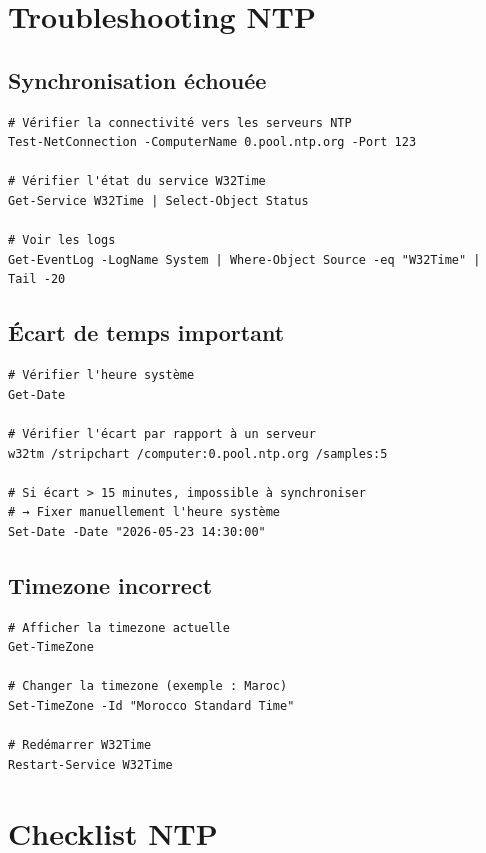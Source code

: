\section{Troubleshooting NTP}

\subsection{Synchronisation échouée}

\begin{lstlisting}[style=powershell]
# Vérifier la connectivité vers les serveurs NTP
Test-NetConnection -ComputerName 0.pool.ntp.org -Port 123

# Vérifier l'état du service W32Time
Get-Service W32Time | Select-Object Status

# Voir les logs
Get-EventLog -LogName System | Where-Object Source -eq "W32Time" | Tail -20
\end{lstlisting}

\subsection{Écart de temps important}

\begin{lstlisting}[style=powershell]
# Vérifier l'heure système
Get-Date

# Vérifier l'écart par rapport à un serveur
w32tm /stripchart /computer:0.pool.ntp.org /samples:5

# Si écart > 15 minutes, impossible à synchroniser
# → Fixer manuellement l'heure système
Set-Date -Date "2026-05-23 14:30:00"
\end{lstlisting}

\subsection{Timezone incorrect}

\begin{lstlisting}[style=powershell]
# Afficher la timezone actuelle
Get-TimeZone

# Changer la timezone (exemple : Maroc)
Set-TimeZone -Id "Morocco Standard Time"

# Redémarrer W32Time
Restart-Service W32Time
\end{lstlisting}

\section{Checklist NTP}

